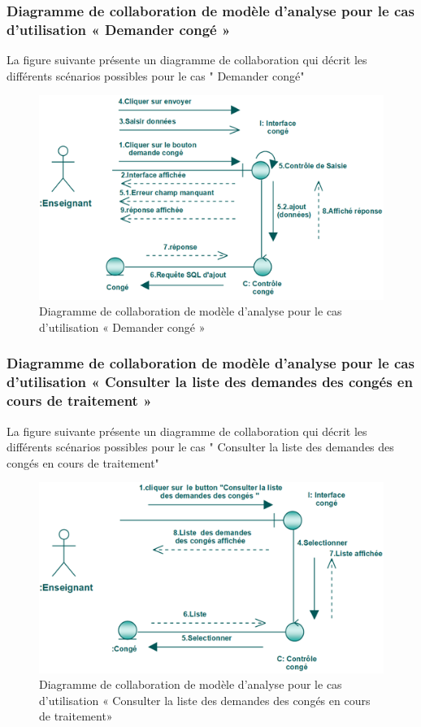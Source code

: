 \documentclass[12 pt]{report}
\begin{document}
\subsubsection{Diagramme  de  collaboration  de  modèle  d'analyse  pour  le  cas  d'utilisation « Demander  congé »  }
La figure suivante présente un diagramme de collaboration qui décrit les différents
scénarios possibles pour le cas " Demander  congé"
\begin{figure}[h]
\begin{center}
\includegraphics[width= 14 cm , height =5.5 cm]{colla_ens_demandeconge.png}
 \caption{Diagramme  de  collaboration  de  modèle  d'analyse  pour  le  cas  d'utilisation « Demander  congé »}
\end{center}
\end{figure}
\subsubsection{Diagramme  de  collaboration  de  modèle  d'analyse  pour  le  cas  d'utilisation « Consulter la liste des demandes des congés en cours de traitement »  }
La figure suivante présente un diagramme de collaboration qui décrit les différents
scénarios possibles pour le cas " Consulter la liste des demandes des congés en cours de traitement"
\begin{figure}[h]
\begin{center}
\includegraphics[width= 12 cm , height =3.5 cm]{collaconscontrai.PNG}
 \caption{Diagramme  de  collaboration  de  modèle  d'analyse  pour  le  cas  d'utilisation « Consulter la liste des demandes des congés en cours de traitement»}
\end{center}
\end{figure}
\end{document}
